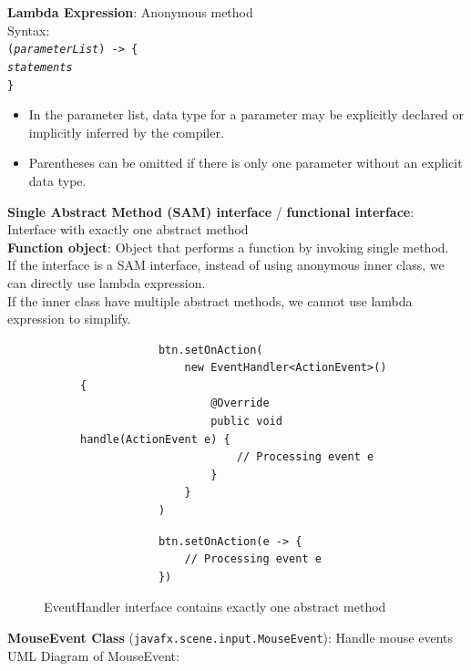 \documentclass{article}
\begin{document}
\textbf{Lambda Expression}: Anonymous method\\
Syntax:\\
\texttt{(\textit{parameterList}) -> \{\\
\hspace*{2em}\textit{statements}\\
\}}
\begin{itemize}
	\item In the parameter list, data type for a parameter may be explicitly declared or implicitly inferred by the compiler.
	\item Parentheses can be omitted if there is only one parameter without an explicit data type.
\end{itemize}

\textbf{Single Abstract Method (SAM) interface} / \textbf{functional interface}: Interface with exactly one abstract method\\
\textbf{Function object}: Object that performs a function by invoking single method.\\
If the interface is a SAM interface, instead of using anonymous inner class, we can directly use lambda expression.\\
If the inner class have multiple abstract methods, we cannot use lambda expression to simplify.

\begin{figure}[h!]
	\centering
	\begin{subfigure}[h]{.49\textwidth}
		\begin{verbatim}
			btn.setOnAction(
			    new EventHandler<ActionEvent>() {
			        @Override
			        public void handle(ActionEvent e) {
			            // Processing event e
			        }
			    }
			)
		\end{verbatim}
	\end{subfigure}
	\begin{subfigure}[h]{.49\textwidth}
		\begin{verbatim}
			btn.setOnAction(e -> {
			    // Processing event e
			})
		\end{verbatim}
	\end{subfigure}
	\caption{EventHandler interface contains exactly one abstract method}
\end{figure}

\newpage

\textbf{MouseEvent Class} (\texttt{javafx.scene.input.MouseEvent}): Handle mouse events\\
UML Diagram of MouseEvent:
\end{document}
